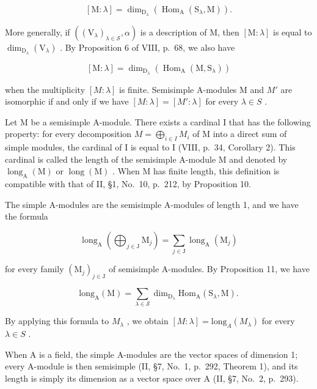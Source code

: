 \[
[ \mathrm{M}: \lambda ] = \dim_ {\mathrm{D} _ {\lambda}} (\operatorname{Hom} _ {\mathrm{A}} (\mathrm{S} _ {\lambda}, \mathrm{M})).\tag{11}
\]

More generally, if \(((\mathrm{V}_{\lambda})_{\lambda \in \mathcal{S}},\alpha)\) is a description of M, then \([\mathrm{M}:\lambda ]\) is equal to \(\dim_{\mathrm{D}_{\lambda}}(\mathrm{V}_{\lambda})\) . By Proposition 6 of VIII, p.~68, we also have

\[
[ \mathrm{M}: \lambda ] = \dim_ {\mathrm{D} _ {\lambda}} (\operatorname{Hom} _ {\mathrm{A}} (\mathrm{M}, \mathrm{S} _ {\lambda}))\tag{12}
\]

when the multiplicity \([M : \lambda]\) is finite. Semisimple A-modules M and \(M'\) are isomorphic if and only if we have \([M : \lambda] = [M' : \lambda]\) for every \(\lambda \in S\) .

Let M be a semisimple A-module. There exists a cardinal I that has the following property: for every decomposition \(M = \bigoplus_{i \in I} M_i\) of M into a direct sum of simple modules, the cardinal of I is equal to I (VIII, p.~34, Corollary 2). This cardinal is called the length of the semisimple A-module M and denoted by \(\operatorname{long}_{\mathrm{A}}(\mathrm{M})\) or \(\operatorname{long}(\mathrm{M})\) . When M has finite length, this definition is compatible with that of II, §1, No.~10, p.~212, by Proposition 10.

The simple A-modules are the semisimple A-modules of length 1, and we have the formula

\[
\operatorname{long} _ {\mathrm{A}} \left(\bigoplus_ {j \in \mathrm{J}} \mathrm{M} _ {j}\right) = \sum_ {j \in \mathrm{J}} \operatorname{long} _ {\mathrm{A}} (\mathrm{M} _ {j})\tag{13}
\]

for every family \((\mathrm{M}_j)_{j\in \mathrm{J}}\) of semisimple A-modules. By Proposition 11, we have

\[
\mathrm{long} _ {\mathrm{A}} (\mathrm{M}) = \sum_ {\lambda \in \mathcal {S}} \dim_ {\mathrm{D} _ {\lambda}} \mathrm{Hom} _ {\mathrm{A}} (\mathrm{S} _ {\lambda}, \mathrm{M}).\tag{14}
\]

By applying this formula to \(M_{\lambda}\) , we obtain \([M : \lambda] = \text{long}_{A}(M_{\lambda})\) for every \(\lambda \in S\) .

When A is a field, the simple A-modules are the vector spaces of dimension 1; every A-module is then semisimple (II, §7, No.~1, p.~292, Theorem 1), and its length is simply its dimension as a vector space over A (II, §7, No.~2, p.~293).

